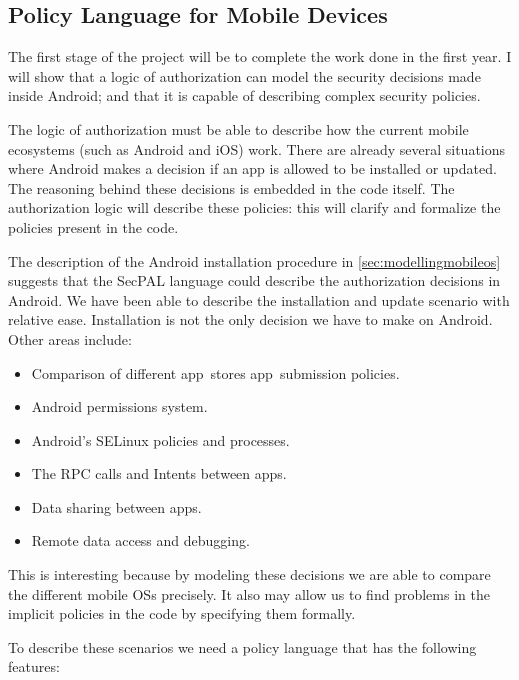 \documentclass[a4paper,sfsidenotes]{%
  scrartcl%
}
\begin{document}
\subsection{Policy Language for Mobile Devices}
\label{sec:proposallang}

The first stage of the project will be to complete the work done in the first
year. I will show that a logic of authorization can model the security decisions
made inside Android; and that it is capable of describing complex security
policies. 

The logic of authorization must be able to describe how the current mobile
ecosystems (such as Android and iOS) work.  There are already several situations
where Android makes a decision if an app is allowed to be installed
or updated.  The reasoning behind these decisions is embedded in the code
itself.  The authorization logic will describe these policies: this
will clarify and formalize the policies present in the code.

The description of the Android installation procedure in
\autoref{sec:modellingmobileos} suggests that the SecPAL language could
describe the authorization decisions in Android. We have been able to describe
the installation and update scenario with relative ease.  Installation is not
the only decision we have to make on Android. Other areas include:

\begin{itemize}
  \item Comparison of different app~stores app~submission policies.
  \item Android permissions system.
  \item Android's SELinux policies and processes.
  \item The \ac{RPC} calls and Intents between apps.
  \item Data sharing between apps.
  \item Remote data access and debugging.
\end{itemize}

This is interesting because by modeling these decisions we are able to
compare the different mobile OSs precisely.  It also may allow us to find
problems in the implicit policies in the code by specifying them formally.

To describe these scenarios we need a policy language that has the following
features:
\end{document}
